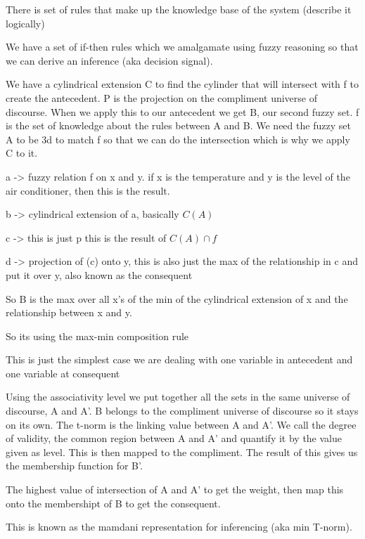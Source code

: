 \documentclass{article}
\begin{document}


There is set of rules that make up the knowledge base of the system (describe it logically)

We have a set of if-then rules which we amalgamate using fuzzy reasoning so that we can derive an inference (aka decision signal).


We have a cylindrical extension C  to find the cylinder that will intersect with f to create the antecedent. P is the projection on the compliment universe of discourse. When we apply this to our antecedent we get B, our second fuzzy set. f is the set of knowledge about the rules between A and B. We need the fuzzy set A to be 3d to match f so that we can do the intersection which is why we apply C to it.


a -> fuzzy relation f on x and y.  if x is the temperature and y is the level of the air conditioner, then this is the result.

b -> cylindrical extension of a, basically $C(A)$

c -> this is just p  this is the result of $C(A)\cap f$

d -> projection of (c) onto y, this is also just the max of the relationship in c and put it over y, also known as the consequent


So B is the max over all x's of the min of the cylindrical extension of x and the relationship between x and y.

So its using the max-min composition rule

This is just the simplest case we are dealing with one variable in antecedent and one variable at consequent






Using the associativity level we put together all the sets in the same universe of discourse, A and A'. B belongs to the compliment universe of discourse so it stays on its own. The t-norm is the linking value between A and A'. We call the degree of validity, the common region between A and A' and quantify it by the value given as level. This is then mapped to the compliment. The result of this gives us the membership function for B'.

The highest value of intersection of A and A' to get the weight, then map this onto the membershipt of B to get the consequent.

This is known as the mamdani representation for inferencing (aka min T-norm).
\end{document}
